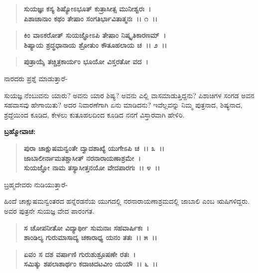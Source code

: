 \begin{verse}
\textbf{ಸುಯಜ್ಞಃ ಕಸ್ಯ ಶಿಷ್ಯೋಽಭೂತ್ ಕುತ್ರಾಸೀತ್ಸ ಮುನೀಶ್ವರಃ~।}\\\textbf{ಪಿಶಾಚಾನಾಂ ಕಥಂ ತೇಷಾಂ ಸಂಗತಿರ್ಭಾವಿತಾತ್ಮನಃ~।। ೧~।। }
\end{verse}

\begin{verse}
\textbf{ಕಿಂ ವಾಽಕರೋತ್ ಸುಯಜ್ಞೋಽಪಿ ತೇಷಾಂ ನಿಷ್ಕೃತಿಕಾರಣಮ್~।}\\\textbf{ಶಿಷ್ಯಾಯ ಶ್ರದ್ಧಧಾನಾಯ ಶ್ರೋತುಂ ಕೌತೂಹಲಾಯ ಚ~।। ೨~।।}
\end{verse}

\begin{verse}
\textbf{ಪುತ್ರಾಯೈ ತಚ್ಚಿತ್ರಕಾರ್ಯಂ ಭೂಯೋ ವಿಸ್ತರತೋ ವದ~।}
\end{verse}

\begin{flushleft}
ನಾರದರು ಪ್ರಶ್ನೆ ಮಾಡುತ್ತಾರೆ-
\end{flushleft}

ಸುಯಜ್ಞ ನೆಂಬುವನು ಯಾರು? ಅವನು ಯಾರ ಶಿಷ್ಯ? ಅವನು ಎಲ್ಲಿ ವಾಸಮಾಡುತ್ತಿದ್ದನು? ಪಿಶಾಚಿಗಳ ಸಂಗಡ ಅವನ ಸಹವಾಸವು ಹೇಗಾಯಿತು? ಅದರ ನಿವಾರಣೆಗಾಗಿ ಏನು ಮಾಡಿದನು? ಇವೆಲ್ಲವನ್ನು ನಿಮ್ಮ ಪುತ್ರನಾದ, ಶಿಷ್ಯನಾದ, ಶ್ರದ್ದೆಯಿಂದ ಕೂಡಿದ, ಕೇಳಲು ಕುತೂಹಲದಿಂದ ಕೂಡಿದ ನನಗೆ ವಿಸ್ತಾರವಾಗಿ ಹೇಳಿರಿ.

\begin{flushleft}
\textbf{ಬ್ರಹ್ಮೋವಾಚ:\enginline{-}}
\end{flushleft}

\begin{verse}
\textbf{ಪುರಾ ಚಾಕ್ಷುಷಮನ್ವಂತೇ ದ್ವಾದಶಾಖ್ಯೆ ಯುಗೇಽಪಿ ಚ~।। ೩~।।}\\\textbf{ಜಾಬಾಲೀರ್ನಾಮತಶ್ಚಾಸೀತ್ ನರನಾರಾಯಣಾಶ್ರಮೇ~।}\\\textbf{ಸುಯಜ್ಞೋ ನಾಮ ತಸ್ಯಾಸೀತ್ತನಯೋ ವೇದಪಾರಗಃ~।। ೪~।।}
\end{verse}

\begin{flushleft}
ಬ್ರಹ್ಮದೇವರು ನುಡಿಯುತ್ತಾರೆ-
\end{flushleft}

ಹಿಂದೆ ಚಾಕ್ಷುಷಮನ್ವಂತರದ ಹನ್ನೆರಡನೆಯ ಯುಗದಲ್ಲಿ ನರನಾರಾಯಣಾಶ್ರಮದಲ್ಲಿ ಜಾಬಾಲಿ ಎಂಬ ಋಷಿಗಳಿದ್ದರು. ಅವರ ಪುತ್ರನೇ ಸುಯಜ್ಞ ವೇದ ಪಾರಂಗತ.

\begin{verse}
\textbf{ಸ ಚೋಪನೀತೋ ವಿದ್ಯಾರ್ಥೀ ಸುಮನಾಃ ಸಹವಾರ್ಷಿಕಃ~।}\\\textbf{ಶಾಂಡಿಲ್ಯ ಗುರುಮಾಸಾದ್ಯ ಚಕಾರಾಧ್ಯ ಯನಂ ತತಃ~।। ೫~।। }
\end{verse}

\begin{verse}
\textbf{ಏವಂ ಸ ದಶ ವರ್ಷಾಣಿ ಗುರುಶುಶ್ರೂಷಣೇ ರತಃ~।}\\\textbf{ಸಮಿತ್ಕು ಶಪಲಾಶಾರ್ಥಂ ಕದಾಚಿದಟವೀಂ ಯಯೌ~।। ೬~।।}
\end{verse}

